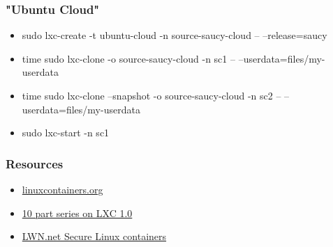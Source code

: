 \documentclass{beamer}
\begin{document}
\begin{frame}
   \frametitle{"Ubuntu Cloud"}
   \begin{itemize}
      \item sudo lxc-create -t ubuntu-cloud -n source-saucy-cloud -- --release=saucy
      \item time sudo lxc-clone -o source-saucy-cloud -n sc1 -- --userdata=files/my-userdata
      \item time sudo lxc-clone --snapshot -o source-saucy-cloud -n sc2 -- --userdata=files/my-userdata
      \item sudo lxc-start -n sc1
   \end{itemize}
\end{frame}

\begin{frame}
   \frametitle{Resources}
   \begin{itemize}
      \item \href{http://linuxcontainers.org}{linuxcontainers.org}
      \item \href{https://www.stgraber.org/2013/12/20/lxc-1-0-blog-post-series/}{10 part series on LXC 1.0}
      \item \href{http://lwn.net/Articles/515034/}{LWN.net Secure Linux containers}
   \end{itemize}
\end{frame}
\end{document}
